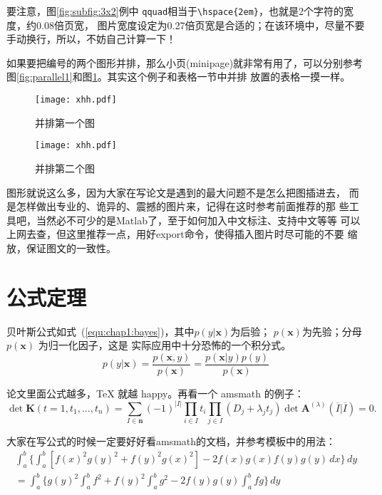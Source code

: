 要注意，图\ref{fig:subfig:3x2}例中
\texttt{qquad}相当于\verb|\hspace{2em}|，也就是2个字符的宽度，约0.08倍页宽，
图片宽度设定为0.27倍页宽是合适的；在该环境中，尽量不要手动换行，所以，不妨自己计算一下！

如果要把编号的两个图形并排，那么小页(minipage)就非常有用了，可以分别参考
图\ref{fig:parallel1}和图\ref{fig:parallel2}。其实这个例子和表格一节中并排
放置的表格一摸一样。
\begin{figure}[htb]
\begin{minipage}{0.48\textwidth}
  \centering
  \texttt{[image: xhh.pdf]}
  \caption{并排第一个图}
  \label{fig:parallel1}
\end{minipage}\hfill
\begin{minipage}{0.48\textwidth}
  \centering
  \texttt{[image: xhh.pdf]}
  \caption{并排第二个图}
  \label{fig:parallel2}
\end{minipage}
\end{figure}

图形就说这么多，因为大家在写论文是遇到的最大问题不是怎么把图插进去，
而是怎样做出专业的、诡异的、震撼的图片来，记得在这时参考前面推荐的那
些工具吧，当然必不可少的是Matlab了，至于如何加入中文标注、支持中文等等
可以上网去查，但这里{\kai 推荐一点}，用好export命令，使得插入图片时尽可能的不要
缩放，保证图文的一致性。

\section{公式定理}
\label{sec:equation}
贝叶斯公式如式~(\ref{equ:chap1:bayes})，其中$p(y|\mathbf{x})$为后验；
$p(\mathbf{x})$为先验；分母$p(\mathbf{x})$ 为归一化因子，这是
实际应用中十分恐怖的一个积分式。
\begin{equation}
\label{equ:chap1:bayes}
p(y|\mathbf{x}) = \frac{p(\mathbf{x},y)}{p(\mathbf{x})}=
\frac{p(\mathbf{x}|y)p(y)}{p(\mathbf{x})} 
\end{equation}

论文里面公式越多，\TeX{} 就越 happy。再看一个 \textsf{amsmath} 的例子：
\newcommand{\envert}[1]{\left\lvert#1\right\rvert} 
\begin{equation}\label{detK2}
\det\mathbf{K}(t=1,t_1,\dots,t_n)=\sum_{I\in\mathbf{n}}(-1)^{\envert{I}}
\prod_{i\in I}t_i\prod_{j\in I}(D_j+\lambda_jt_j)\det\mathbf{A}
^{(\lambda)}(\overline{I}|\overline{I})=0.
\end{equation} 

大家在写公式的时候一定要好好看\textsf{amsmath}的文档，并参考模板中的用法：
\begin{multline*}%
\int_a^b\biggl\{\int_a^b[f(x)^2g(y)^2+f(y)^2g(x)^2]
 -2f(x)g(x)f(y)g(y)\,dx\biggr\}\,dy \\
 =\int_a^b\biggl\{g(y)^2\int_a^bf^2+f(y)^2
  \int_a^b g^2-2f(y)g(y)\int_a^b fg\biggr\}\,dy
\end{multline*}

